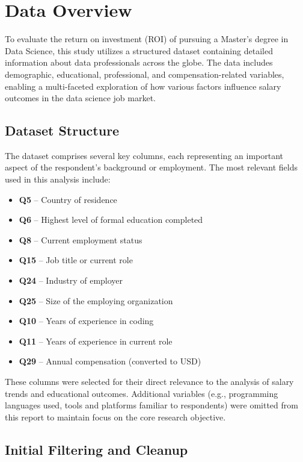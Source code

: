 \chapter{Data Overview}

To evaluate the return on investment (ROI) of pursuing a Master’s degree in Data Science, this study utilizes a structured dataset containing detailed information about data professionals across the globe. The data includes demographic, educational, professional, and compensation-related variables, enabling a multi-faceted exploration of how various factors influence salary outcomes in the data science job market.

\section{Dataset Structure}

The dataset comprises several key columns, each representing an important aspect of the respondent's background or employment. The most relevant fields used in this analysis include:

\begin{itemize}
    \item \textbf{Q5} – Country of residence
    \item \textbf{Q6} – Highest level of formal education completed
    \item \textbf{Q8} – Current employment status
    \item \textbf{Q15} – Job title or current role
    \item \textbf{Q24} – Industry of employer
    \item \textbf{Q25} – Size of the employing organization
    \item \textbf{Q10} – Years of experience in coding
    \item \textbf{Q11} – Years of experience in current role
    \item \textbf{Q29} – Annual compensation (converted to USD)
\end{itemize}

These columns were selected for their direct relevance to the analysis of salary trends and educational outcomes. Additional variables (e.g., programming languages used, tools and platforms familiar to respondents) were omitted from this report to maintain focus on the core research objective.

\section{Initial Filtering and Cleanup}

